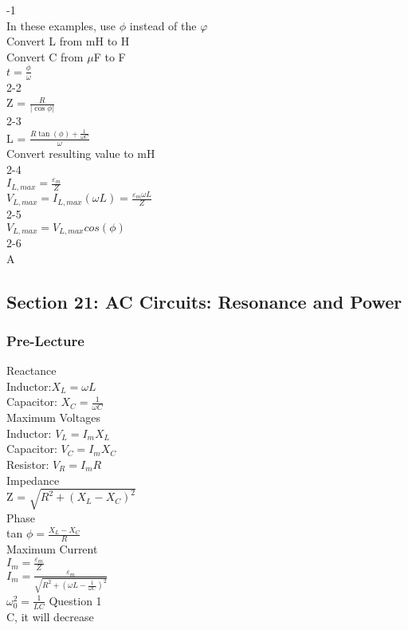 \documentclass{article}
\begin{document}
\vspace{2mm}

-1 \\
In these examples, use $\phi$ instead of the $\varphi$ \\
Convert L from mH to H \\
Convert C from $\mu$F to F \\
$t = \frac{\phi}{\omega}$ \\
2-2 \\
Z = $\frac{R}{\vert \cos{\phi} \vert}$ \\
2-3 \\
L = $\frac{R \tan(\phi) + \frac{1}{\omega C}}{\omega}$ \\
Convert resulting value to mH \\
2-4 \\
$I_{L,max} = \frac{\varepsilon_m}{Z}$ \\
$V_{L,max} = I_{L,max}(\omega L) = \frac{\varepsilon_m \omega L}{Z}$ \\
2-5 \\
$V_{L,max} = V_{L,max} cos(\phi)$ \\
2-6 \\
A

\subsection{Section 21: AC Circuits: Resonance and Power}

\subsubsection{Pre-Lecture}
\noindent
Reactance \\
Inductor:$X_L = \omega L$ \\
Capacitor: $X_C = \frac{1}{\omega C}$ \\
Maximum Voltages \\
Inductor: $V_L = I_m X_L$ \\
Capacitor: $V_C = I_m X_C$ \\
Resistor: $V_R = I_m R$ \\
Impedance \\
Z = $\sqrt{R^2 + (X_L - X_C)^2}$ \\
Phase \\
tan $\phi = \frac{X_L - X_C}{R}$ \\
Maximum Current \\
$I_m = \frac{\varepsilon_m}{Z}$ \\
$I_m = \frac{\varepsilon_m}{\sqrt{R^2 + (\omega L - \frac{1}{\omega C})^2}}$\\
$\omega_0^2 = \frac{1}{L C}$
Question 1 \\
C, it will decrease 
\end{document}
